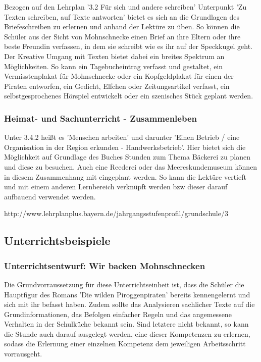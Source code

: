 Bezogen auf den Lehrplan '3.2 Für sich und andere schreiben' Unterpunkt 'Zu Texten schreiben, auf Texte antworten' bietet es sich an die Grundlagen des Briefeschreiben zu erlernen und anhand der Lektüre zu üben. So können die Schüler aus der Sicht von Mohnschnecke einen Brief an ihre Eltern oder ihre beste Freundin verfassen, in dem sie schreibt wie es ihr auf der Speckkugel geht. Der Kreative Umgang mit Texten bietet dabei ein breites Spektrum an Möglichkeiten. So kann ein Tagebucheintrag verfasst und gestaltet, ein Vermisstenplakat für Mohnschnecke oder ein Kopfgeldplakat für einen der Piraten entworfen, ein Gedicht, Elfchen oder Zeitungsartikel verfasst, ein selbstgesprochenes Hörspiel entwickelt oder ein szenisches Stück geplant werden.

\subsubsection{Heimat- und Sachunterricht - Zusammenleben}

Unter 3.4.2 heißt es 'Menschen arbeiten' und darunter 'Einen Betrieb / eine Organisation in der Region erkunden - Handwerksbetrieb'. Hier bietet sich die Möglichkeit auf Grundlage des Buches Stunden zum Thema Bäckerei zu planen und diese zu besuchen. Auch eine Reederei oder das Meereskundemuseum können in diesem Zusammenhang mit eingeplant werden. So kann die Lektüre vertieft und mit einem anderen Lernbereich verknüpft werden bzw dieser darauf aufbauend verwendet werden.


http://www.lehrplanplus.bayern.de/jahrgangsstufenprofil/grundschule/3

\subsection{Unterrichtsbeispiele}



\subsubsection{Unterrichtsentwurf: Wir backen Mohnschnecken}

Die Grundvorraussetzung für diese Unterrichtseinheit ist, dass die Schüler die Hauptfigur des Romans 'Die wilden Piroggenpiraten' bereits kennengelernt und sich mit ihr befasst haben. Zudem sollte das Analysieren sachlicher Texte auf die Grundinformationen, das Befolgen einfacher Regeln und das angemessene Verhalten in der Schulküche bekannt sein. Sind letztere nicht bekannt, so kann die Stunde auch darauf ausgelegt werden, eine dieser Kompetenzen zu erlernen, sodass die Erlernung einer einzelnen Kompetenz dem jeweiligen Arbeitsschritt vorrausgeht.

